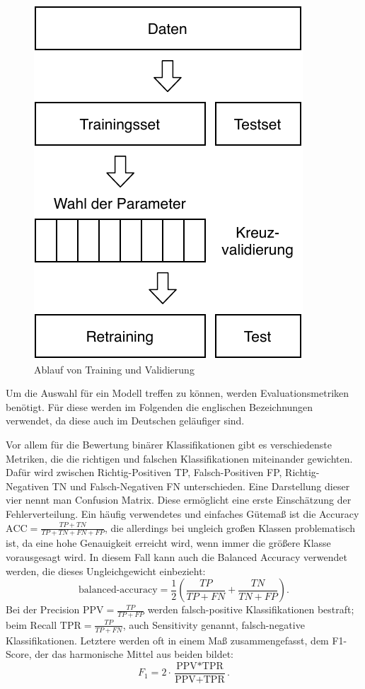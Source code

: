 	\begin{figure}[H]
		\centering
		\includegraphics[scale=0.85]{pic/validation-ablauf.pdf}
		\caption{Ablauf von Training und Validierung}
		\label{fig:validation-ablauf}
	\end{figure}
	
	Um die Auswahl für ein Modell treffen zu können, werden Evaluationsmetriken benötigt. Für diese werden im Folgenden die englischen Bezeichnungen verwendet, da diese auch im Deutschen geläufiger sind.
	
	Vor allem für die Bewertung binärer Klassifikationen gibt es verschiedenste Metriken, die die richtigen und falschen Klassifikationen miteinander gewichten. Dafür wird zwischen Richtig-Positiven TP, Falsch-Positiven FP, Richtig-Negativen TN und Falsch-Negativen FN unterschieden. Eine Darstellung dieser vier nennt man Confusion Matrix. Diese ermöglicht eine erste Einschätzung der Fehlerverteilung. Ein häufig verwendetes und einfaches Gütemaß ist die Accuracy $\text{ACC} = \frac{TP + TN}{TP + TN + FN + FP}$, die allerdings bei ungleich großen Klassen problematisch ist, da eine hohe Genauigkeit erreicht wird, wenn immer die größere Klasse vorausgesagt wird. In diesem Fall kann auch die Balanced Accuracy verwendet werden, die dieses Ungleichgewicht einbezieht:
	\[
		\text{balanced-accuracy} = \frac{1}{2}\left( \frac{TP}{TP + FN} + \frac{TN}{TN + FP}\right).
	\]
	 Bei der Precision $\text{PPV} = \frac{TP}{TP + FP}$ werden falsch-positive Klassifikationen \glqq bestraft\grqq{}; beim Recall $\text{TPR} = \frac{TP}{TP + FN}$, auch Sensitivity genannt, falsch-negative Klassifikationen. Letztere werden oft in einem Maß zusammengefasst, dem F1-Score, der das harmonische Mittel aus beiden bildet:
	\[
		F_1 = 2 \cdot \frac{\text{PPV} * \text{TPR}}{\text{PPV} + \text{TPR}}.
	\]
	
